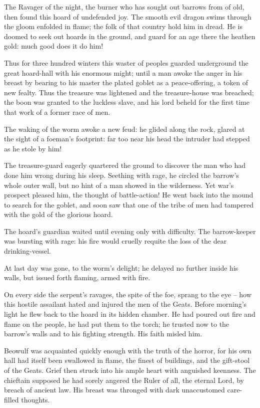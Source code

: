\documentclass[a4paper]{article}
\begin{document}
{The Ravager of the night,
the burner who has sought out barrows from of old,
then found this hoard of undefended joy.
The smooth evil dragon swims through the gloom
enfolded in flame; the folk of that country
hold him in dread. He is doomed to seek out
hoards in the ground, and guard for an age there
the heathen gold: much good does it do him!

Thus for three hundred winters this waster of peoples
guarded underground the great hoard-hall
with his enormous might; until a man awoke
the anger in his breast by bearing to his master
the plated goblet as a peace-offering,
a token of new fealty. Thus the treasure was lightened
and the treasure-house was breached; the boon was granted
to the luckless slave, and his lord beheld
for the first time that work of a former race of men.

The waking of the worm awoke a new feud:
he glided along the rock, glared at the sight
of a foeman's footprint: far too near his head
the intruder had stepped as he stole by him!

The treasure-guard eagerly
quartered the ground to discover the man
who had done him wrong during his sleep.
Seething with rage, he circled the barrow's
whole outer wall, but no hint of a man
showed in the wilderness. Yet war's prospect pleased him,
the thought of battle-action! He went back into the mound
to search for the goblet, and soon saw that one
of the tribe of men had tampered with the gold
of the glorious hoard.

\newpage
The hoard's guardian
waited until evening only with difficulty.
The barrow-keeper was bursting with rage:
his fire would cruelly requite the loss
of the dear drinking-vessel.

At last day was gone,
to the worm's delight; he delayed no further
inside his walls, but issued forth flaming,
armed with fire.

On every side the serpent's ravages,
the spite of the foe, sprang to the eye –
how this hostile assailant hated and injured
the men of the Geats. Before morning's light
he flew back to the hoard in its hidden chamber.
He had poured out fire and flame on the people,
he had put them to the torch; he trusted now to the barrow's walls
and to his fighting strength. His faith misled him.

Beowulf was acquainted quickly enough
with the truth of the horror, for his own hall had itself
been swallowed in flame, the finest of buildings,
and the gift-stool of the Geats. Grief then struck
into his ample heart with anguished keenness.
The chieftain supposed he had sorely angered
the Ruler of all, the eternal Lord,
by breach of ancient law. His breast was thronged
with dark unaccustomed care-filled thoughts.

}
\end{document}
